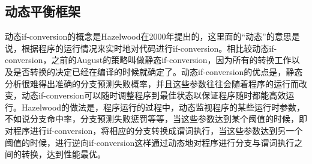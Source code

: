 \subsection{动态平衡框架}

动态if-conversion的概念是Hazelwood在2000年提出的\cite{Hazelwood00alightweight}，这里面的“动态”的意思是说，根据程序的运行情况来实时地对代码进行if-conversion。相比较动态if-conversion，之前的August的策略叫做静态if-conversion，因为所有的转换工作以及是否转换的决定已经在编译的时候就确定了。动态if-conversion的优点是，静态分析很难得出准确的分支预测失败概率，并且这些参数往往会随着程序的运行而改变，动态if-conversion可以随时调整程序到最佳状态以保证程序随时都能高效运行。Hazelwood的做法是，程序运行的过程中，动态监视程序的某些运行时参数，不如说分支命中率，分支预测失败惩罚等等，当这些参数达到某个阈值的时候，即对程序进行if-conversion，将相应的分支转换成谓词执行，当这些参数达到另一个阈值的时候，进行逆向if-conversion这样通过动态地对程序进行分支与谓词执行之间的转换，达到性能最优。